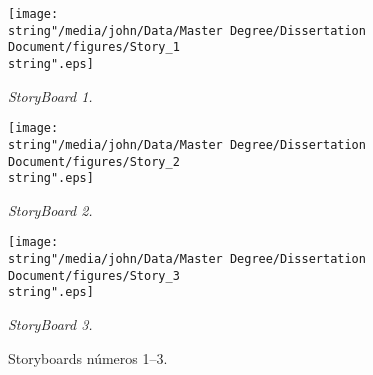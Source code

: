 \begin{figure}[H]
\begin{centering}
\texttt{[image: \\string"/media/john/Data/Master Degree/Dissertation Document/figures/Story\_1\\string".eps]}
\par\end{centering}
\begin{centering}
\emph{\small{}StoryBoard 1.}
\par\end{centering}{\small \par}
\smallskip{}

\begin{centering}
\texttt{[image: \\string"/media/john/Data/Master Degree/Dissertation Document/figures/Story\_2\\string".eps]}
\par\end{centering}
\begin{centering}
\textit{\small{}StoryBoard 2.}
\par\end{centering}{\small \par}
\smallskip{}

\begin{centering}
\texttt{[image: \\string"/media/john/Data/Master Degree/Dissertation Document/figures/Story\_3\\string".eps]}
\par\end{centering}
\begin{centering}
\textit{\small{}StoryBoard 3.}
\par\end{centering}{\small \par}
\centering{}\caption{Storyboards números 1–3.\label{fig:Storyboard-numero-1}}
\end{figure}

